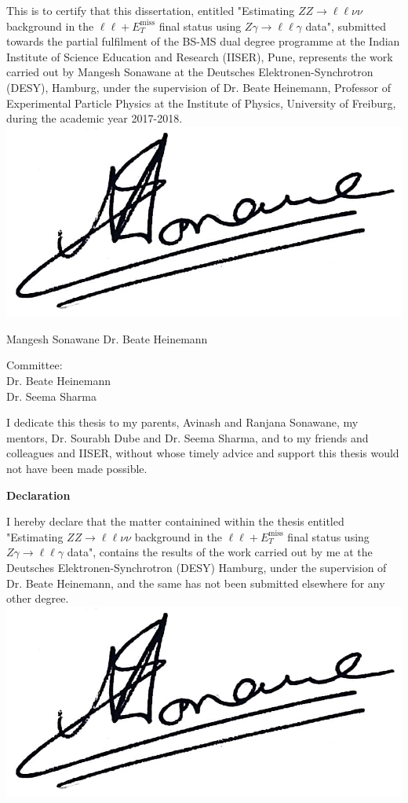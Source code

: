 \documentclass[12pt,a4paper,openright,twoside]{report}
\newcommand{\ZZ}{$ZZ\to \ell\ell\nu\nu$ }
\newcommand{\Zg}{$Z\gamma\to \ell\ell\gamma$ }
\newcommand{\llM}{$\ell\ell+E_T^{\mathrm{miss}}$ }
\newcommand\blankpage{%
    \null
    \thispagestyle{empty}%
    \addtocounter{page}{-1}%
    \newpage}
\begin{document}
\vspace{1cm}
\normalsize This is to certify that this dissertation, entitled "Estimating \ZZ background in the \llM final status using \Zg data", submitted towards the partial fulfilment of the BS-MS dual degree programme at the Indian Institute of Science Education and Research (IISER), Pune, represents the work carried out by Mangesh Sonawane at the Deutsches Elektronen-Synchrotron (DESY), Hamburg, under the supervision of Dr. Beate Heinemann, Professor of Experimental Particle Physics at the Institute of Physics, University of Freiburg, during the academic year 2017-2018.
\vfill
\hspace{1cm}
\includegraphics[width=0.2\linewidth]{sign.jpg}
\begin{center}
Mangesh Sonawane\hspace{8cm}
Dr. Beate Heinemann
\end{center}
\vfill
Committee:\\
Dr. Beate Heinemann\\
Dr. Seema Sharma
\vfill
\vfill
\newpage
\blankpage
\newpage
{}
\vspace*{\fill}
\noindent I dedicate this thesis to my parents, Avinash and Ranjana Sonawane, my mentors, Dr. Sourabh Dube and Dr. Seema Sharma, and to my friends and colleagues and IISER, without whose timely advice and support this thesis would not have been made possible.
\vspace*{\fill}
\newpage
\blankpage
\newpage
\begin{center}
\Huge \textbf{Declaration\\}
\end{center}
\vspace{1cm}
\normalsize I hereby declare that the matter containined within the thesis entitled "Estimating \ZZ background in the \llM final status using \Zg data", contains the results of the work carried out by me at the Deutsches Elektronen-Synchrotron (DESY) Hamburg, under the supervision of Dr. Beate Heinemann, and the same has not been submitted elsewhere for any other degree.
\vfill
\hspace{1cm}
\includegraphics[width=0.18\linewidth]{sign.jpg}
\end{document}
